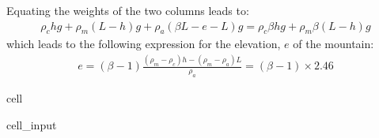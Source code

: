 \documentclass[letterpaper,10pt,english]{jupyterBook}
\begin{document}
\sphinxAtStartPar
Equating the weights of the two columns leads to:
\begin{equation*}
\begin{split}\rho_chg + \rho_m(L-h)g +\rho_a(\beta L-e-L)g = \rho_c\beta hg+\rho_m\beta(L-h)g\end{split}
\end{equation*}
\sphinxAtStartPar
which leads to the following expression for the elevation, \(e\) of the mountain:
\begin{equation*}
\begin{split}e = (\beta-1)\frac{(\rho_m-\rho_c)h-(\rho_m-\rho_a)L}{\rho_a} = (\beta-1)\times 2.46\end{split}
\end{equation*}
\begin{sphinxuseclass}{cell}\begin{sphinxVerbatimInput}

\begin{sphinxuseclass}{cell_input}
\begin{sphinxVerbatim}[commandchars=\\\{\}]
  
        
\end{sphinxVerbatim}

\end{sphinxuseclass}\end{sphinxVerbatimInput}

\end{sphinxuseclass}
\end{document}
